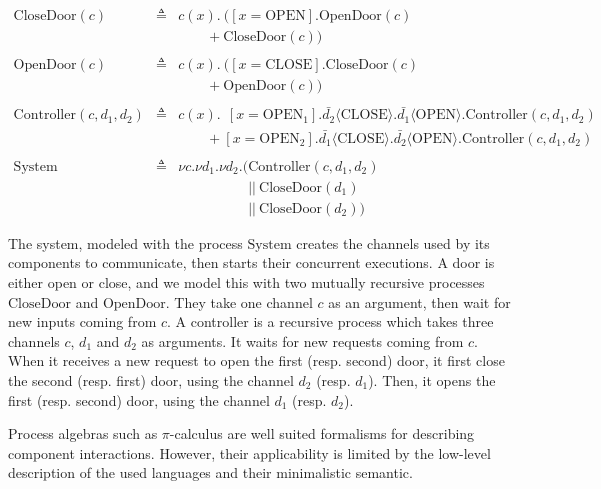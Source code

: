 \begin{example}
  \[
    \begin{array}{rcl}
      \mathrm{CloseDoor}(c)
      & \triangleq
      & c(x) . \ ([x = \mathrm{OPEN}] . \mathrm{OpenDoor}(c) \\
      &
      & \qquad + \mathrm{CloseDoor}(c)) \\
      & & \\
      \mathrm{OpenDoor}(c)
      & \triangleq
      & c(x) . \ ([x = \mathrm{CLOSE}] . \mathrm{CloseDoor}(c) \\
      &
      & \qquad + \mathrm{OpenDoor}(c)) \\
      & & \\
      \mathrm{Controller}(c, d_1, d_2)
      & \triangleq
      & c(x). \ \ [x = \mathrm{OPEN}_1] . \bar{d_2} \langle
        \mathrm{CLOSE} \rangle . \bar{d_1} \langle \mathrm{OPEN} \rangle . \mathrm{Controller}(c, d_1, d_2) \\
      &
      & \qquad + [x = \mathrm{OPEN}_2] . \bar{d_1} \langle
        \mathrm{CLOSE} \rangle . \bar{d_2} \langle \mathrm{OPEN} \rangle. \mathrm{Controller}(c, d_1, d_2) \\
      & & \\
      \mathrm{System}
      & \triangleq
      & \nu c. \nu d_1. \nu d_2. (\mathrm{Controller}(c, d_1, d_2) \\
      &
      & \quad\qquad\qquad ||\ \mathrm{CloseDoor}(d_1) \\
      &
      & \quad\qquad\qquad ||\ \mathrm{CloseDoor}(d_2))
    \end{array}
  \]

  The system, modeled with the process \( \mathrm{System} \) creates the
  channels used by its components to communicate, then starts their concurrent
  executions.
  A door is either open or close, and we model this with two mutually recursive
  processes \( \mathrm{CloseDoor} \) and \( \mathrm{OpenDoor} \).
  They take one channel \( c \) as an argument, then wait for new inputs coming
  from \( c \).
  A controller is a recursive process which takes three channels \( c \),
  \( d_1 \) and \( d_2 \) as arguments.
  It waits for new requests coming from \( c \).
  When it receives a new request to open the first (resp. second) door, it first
  close the second (resp. first) door, using the channel \( d_2 \) (resp.
  \( d_1 \)).
  Then, it opens the first (resp. second) door, using the channel \( d_1 \)
  (resp. \( d_2 \)).
\end{example}

Process algebras such as \( \pi \)-calculus are well suited formalisms for
describing component interactions.
%
However, their applicability is limited by the low-level description of the used
languages and their minimalistic semantic. 

